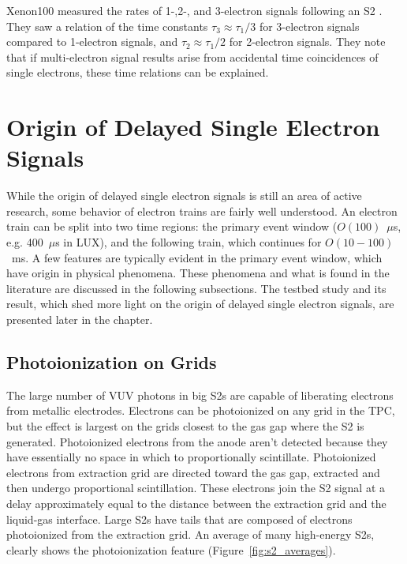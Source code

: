 Xenon100 measured the rates of 1-,2-, and 3-electron signals following an S2 \cite{Aprile2014}. They saw a relation of the time constants $\tau_{3} \approx \tau_{1}/3$ for 3-electron signals compared to 1-electron signals, and $\tau_{2} \approx \tau_{1}/2$ for 2-electron signals. They note that if multi-electron signal results arise from accidental time coincidences of single electrons, these time relations can be explained. 


\section{Origin of Delayed Single Electron Signals}
While the origin of delayed single electron signals is still an area of active research, some behavior of electron trains are fairly well understood. An electron train can be split into two time regions: the primary event window ($O(100)$~$\mu$s, e.g. 400~$\mu$s in \ac{LUX}), and the following train, which continues for $O(10-100)$~ms. A few features are typically evident in the primary event window, which have origin in physical phenomena. These phenomena and what is found in the literature are discussed in the following subsections. The testbed study and its result, which shed more light on the origin of delayed single electron signals, are presented later in the chapter. 

\subsection{Photoionization on Grids} 
The large number of \ac{VUV} photons in big S2s are capable of liberating electrons from metallic electrodes. Electrons can be photoionized on any grid in the \ac{TPC}, but the effect is largest on the grids closest to the gas gap where the S2 is generated. Photoionized electrons from the anode aren't detected because they have essentially no space in which to proportionally scintillate. Photoionized electrons from extraction grid are directed toward the gas gap, extracted and then undergo proportional scintillation. These electrons join the S2 signal at a delay approximately equal to the distance between the extraction grid and the liquid-gas interface. Large S2s have tails that are composed of electrons photoionized from the extraction grid. An average of many high-energy S2s, clearly shows the photoionization feature (Figure~\ref{fig:s2_averages}). 

